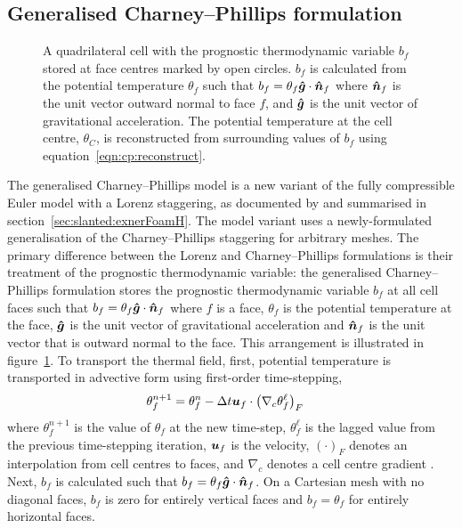 \subsection{Generalised Charney--Phillips formulation}

\begin{figure}
	\centering
	
	\caption{A quadrilateral cell with the prognostic thermodynamic variable $b_f$ stored at face centres marked by open circles.
	$b_f$ is calculated from the potential temperature $\theta_f$ such that $b_f = \theta_f \bm{\hat{g}} \cdot \bm{\hat{n}}_f$ where $\bm{\hat{n}}_f$ is the unit vector outward normal to face $f$, and $\bm{\hat{g}}$ is the unit vector of gravitational acceleration.
	The potential temperature at the cell centre, $\theta_C$, is reconstructed from surrounding values of $b_f$ using equation~\eqref{eqn:cp:reconstruct}.}
	\label{fig:cp:staggering}
\end{figure}

The generalised Charney--Phillips model is a new variant of the fully compressible Euler model with a Lorenz staggering, as documented by \citet{weller-shahrokhi2014} and summarised in section~\ref{sec:slanted:exnerFoamH}.
The model variant uses a newly-formulated generalisation of the Charney--Phillips staggering for arbitrary meshes.
The primary difference between the Lorenz and Charney--Phillips formulations is their treatment of the prognostic thermodynamic variable: the generalised Charney--Phillips formulation stores the prognostic thermodynamic variable $b_f$ at all cell faces such that $b_f = \theta_f \bm{\hat{g}} \cdot \bm{\hat{n}}_f$ where $f$ is a face, $\theta_f$ is the potential temperature at the face, $\bm{\hat{g}}$ is the unit vector of gravitational acceleration and $\bm{\hat{n}}_f$ is the unit vector that is outward normal to the face.
This arrangement is illustrated in figure~\ref{fig:cp:staggering}.
To transport the thermal field, first, potential temperature is transported in advective form using first-order time-stepping,
\begin{align}
	\theta_f^{n+1} &= \theta_f^n - \Delta t \bm{u}_f \cdot \left( \nabla_c \theta_f^{\ell} \right)_F \label{eqn:cp:advection}
\end{align}
where $\theta_f^{n+1}$ is the value of $\theta_f$ at the new time-step, $\theta_f^\ell$ is the lagged value from the previous time-stepping iteration, $\bm{u}_f$ is the velocity, $\left( \cdot \right)_F$ denotes an interpolation from cell centres to faces, and $\nabla_c$ denotes a cell centre gradient \citep{weller-shahrokhi2014}.
Next, $b_f$ is calculated such that $b_f = \theta_f \bm{\hat{g}} \cdot \bm{\hat{n}}_f$.  
On a Cartesian mesh with no diagonal faces, $b_f$ is zero for entirely vertical faces and $b_f = \theta_f$ for entirely horizontal faces.

